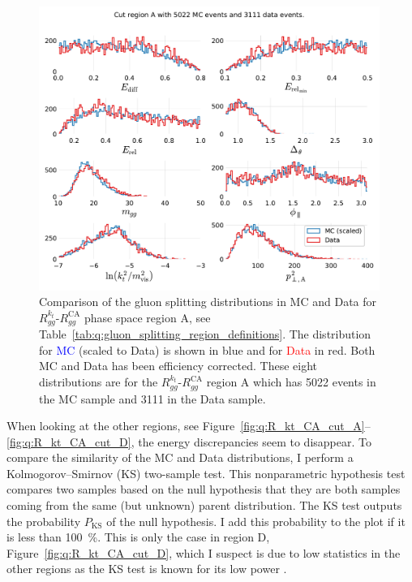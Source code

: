 \begin{figure}[h!]
  \centerfloat
  \includegraphics[width=0.99\textwidth, trim=0 0 0 0, clip]{figures/quarks/gtag-R_kt_CA_histograms-down_sample=1.00-ML_vars=vertex-selection=b-ejet_min=4-n_iter_RS_lgb=99-n_iter_RS_xgb=9-cdot_cut=0.90-version=19-njet=4.pdf}
  \caption[Gluon Splitting Distribution Comparison in MC and Data for $R_{gg}^{k_t}$-$R_{gg}^\mathrm{CA}$ Phase Space Region A]
          {Comparison of the gluon splitting distributions in MC and Data for $R_{gg}^{k_t}$-$R_{gg}^\mathrm{CA}$ phase space region A, see Table~\ref{tab:q:gluon_splitting_region_definitions}. The distribution for \textcolor{blue}{MC} (scaled to Data) is shown in blue and for \textcolor{red}{Data} in red. Both MC and Data has been efficiency corrected. These eight distributions are for the $R_{gg}^{k_t}$-$R_{gg}^\mathrm{CA}$ region A which has \num{5022} events in the MC sample and \num{3111} in the Data sample. } 
  \label{fig:q:R_kt_CA_cut_A_non_appendix}
\end{figure}

When looking at the other regions, see Figure~\ref{fig:q:R_kt_CA_cut_A}--\ref{fig:q:R_kt_CA_cut_D}, the energy discrepancies seem to disappear. To compare the similarity of the MC and Data distributions, I perform a Kolmogorov–Smirnov (KS) two-sample test. This nonparametric hypothesis test compares two samples based on the null hypothesis that they are both samples coming from the same (but unknown) parent distribution. The KS test outputs the probability $P_\mathrm{KS}$ of the null hypothesis. I add this probability to the plot if it is less than \SI{100}{\percent}. This is only the case in region D, Figure~\ref{fig:q:R_kt_CA_cut_D}, which I suspect is due to low statistics in the other regions as the KS test is known for its low power \autocite{mohdrazaliPowerComparisonsShapiroWilk2011}. 

